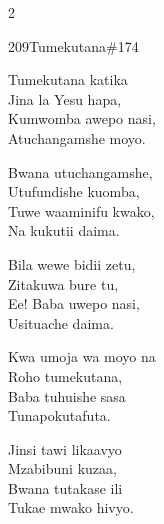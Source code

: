 \documentclass{article}
\begin{document}
\begin{multicols}{2}
\begin{hymn}{209}{Tumekutana}{\#174}
\begin{stanza}
Tumekutana katika\\
Jina la Yesu hapa,\\
Kumwomba awepo nasi,\\
Atuchangamshe moyo.
\end{stanza}
\begin{chorus}
Bwana utuchangamshe,\\
Utufundishe kuomba,\\
Tuwe waaminifu kwako,\\
Na kukutii daima.
\end{chorus}
\begin{stanza}
Bila wewe bidii zetu,\\
Zitakuwa bure tu,\\
Ee! Baba uwepo nasi,\\
Usituache daima.
\end{stanza}
\begin{stanza}
Kwa umoja wa moyo na\\
Roho tumekutana,\\
Baba tuhuishe sasa\\
Tunapokutafuta.
\end{stanza}
\begin{stanza}
Jinsi tawi likaavyo\\
Mzabibuni kuzaa,\\
Bwana tutakase ili\\
Tukae mwako hivyo.
\end{stanza}
\end{hymn}


\end{multicols}
\end{document}
